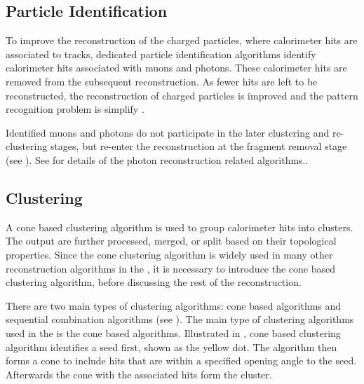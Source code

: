 \subsection{Particle Identification}
\label{sec:particleID}

To improve the reconstruction of the charged particles, where calorimeter hits are associated to tracks, dedicated particle identification algorithms identify calorimeter hits associated with muons and photons. These calorimeter hits are removed from the subsequent reconstruction. As fewer hits are left to be reconstructed, the reconstruction of charged particles is improved and the pattern recognition problem is simplify .

Identified muons and photons do not participate in the later clustering and re-clustering stages, but re-enter the reconstruction at the fragment removal stage (see ). See  for details of the photon reconstruction  related algorithms..


\subsection{Clustering}
\label{sec:pandoraConeCluster}

A cone based clustering algorithm is used to group calorimeter hits into clusters. The output \clusters are further processed, merged, or split based on their topological properties. Since the cone clustering algorithm is widely used in many other reconstruction algorithms in the \pandora, it is necessary to introduce the cone based clustering algorithm, before discussing the rest of the \pandora reconstruction.

There are two main types of clustering algorithms: cone based algorithms and sequential combination algorithms (see ). The main type of clustering algorithms used in the  \pandora is the cone based algorithms. Illustrated in , cone based clustering algorithm identifies a seed first, shown as the yellow dot. The algorithm then forms a cone to include hits that are within a specified opening angle to the seed. Afterwards the cone with the associated hits form the cluster. 




